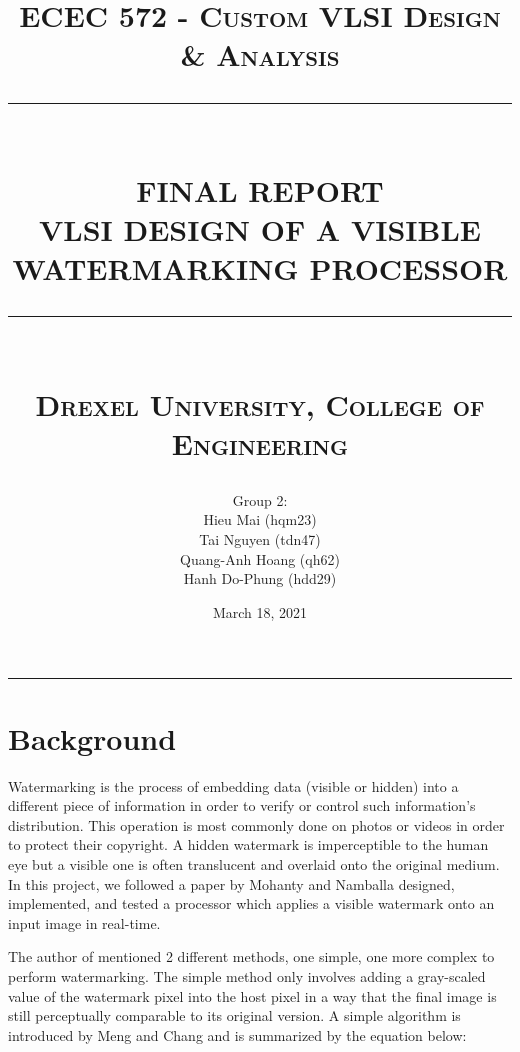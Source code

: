 \documentclass[letterpaper, 11pt]{article}
\newcommand{\HRule}[1]{\rule{\linewidth}{#1}}
\begin{document}
	
	\title{ 
		\normalsize \textsc{ECEC 572 - Custom VLSI Design \& Analysis}
		\\ [2.0cm]
		\HRule{0.5pt} \\
		\LARGE \textbf{\uppercase{Final Report}} \\
		\normalsize  \vspace*{1\baselineskip}
		\LARGE \textbf{\uppercase{VLSI Design of a Visible Watermarking Processor}}
		\HRule{2pt} \\ [0.5cm]
		\normalsize  \vspace*{5\baselineskip}
		\textsc{Drexel University, College of Engineering} \\
		\normalsize  \vspace*{7\baselineskip}
	}
	
	\author{
		Group 2: \\
		Hieu Mai (hqm23)\\
		Tai Nguyen (tdn47)  \\
		Quang-Anh Hoang (qh62) \\
		Hanh Do-Phung (hdd29)\\ 
	}
	
	\date{March 18, 2021}
	
	\maketitle
	\newpage
	
	\tableofcontents
	\newpage
	
	\rule{\textwidth}{1pt}
	
	\section{Background}
	\label{sec:background}
	
	Watermarking is the process of embedding data (visible or hidden) into a different piece of information in order to verify or control such information’s distribution. This operation is most commonly done on photos or videos in order to protect their copyright. A hidden watermark is imperceptible to the human eye but a visible one is often translucent and overlaid onto the original medium. In this project, we followed a paper by Mohanty and Namballa \cite{1} designed, implemented, and tested a processor which applies a visible watermark onto an input image in real-time.
	
	The author of \cite{1} mentioned 2 different methods, one simple, one more complex to perform watermarking. The simple method only involves adding a gray-scaled value of the watermark pixel into the host pixel in a way that the final image is still perceptually comparable to its original version. A simple algorithm is introduced by Meng and Chang \cite{2} and is summarized by the equation below:
	
\end{document}
